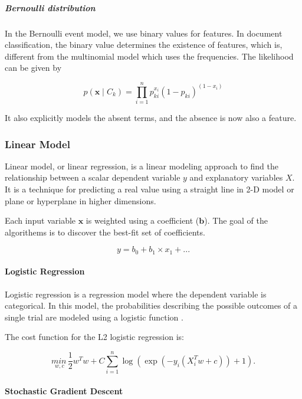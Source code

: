 \documentclass[12pt,a4paper]{report}
\begin{document}
          \subparagraph{Bernoulli distribution}

          In the Bernoulli event model, we use binary values for features. In document classification, the binary value determines the existence of features, which is, different from the multinomial model which uses the frequencies. The likelihood can be given by

          $$
            p(\mathbf{x} \mid C_k) = \prod_{i=1}^n p_{ki}^{x_i} (1 - p_{ki})^{(1-x_i)}
          $$

          It also explicitly models the absent terms, and the absence is now also a feature.

      \subsubsection{Linear Model}

        Linear model, or linear regression, is a linear modeling approach to find the relationship between a scalar dependent variable $y$ and explanatory variables $X$. It is a technique for predicting a real value using a straight line in 2-D model or plane or hyperplane in higher dimensions.

        Each input variable $\mathbf{x}$ is weighted using a coefficient ($\mathbf{b}$). The goal of the algorithems is to discover the best-fit set of coefficients.

        \[
          y = b_0 + b_1 \times x_1 + ...
        \]

        \paragraph{Logistic Regression}

          Logistic regression is a regression model where the dependent variable is categorical. In this model, the probabilities describing the possible outcomes of a single trial are modeled using a logistic function \cite{lr-sklearn}.

          The cost function for the L2 logistic regression is:

          \[
            \underset{w, c}{min\,} \frac{1}{2}w^T w + C \sum_{i=1}^n \log(\exp(- y_i (X_i^T w + c)) + 1) .
          \]

        \paragraph{Stochastic Gradient Descent}
\end{document}
